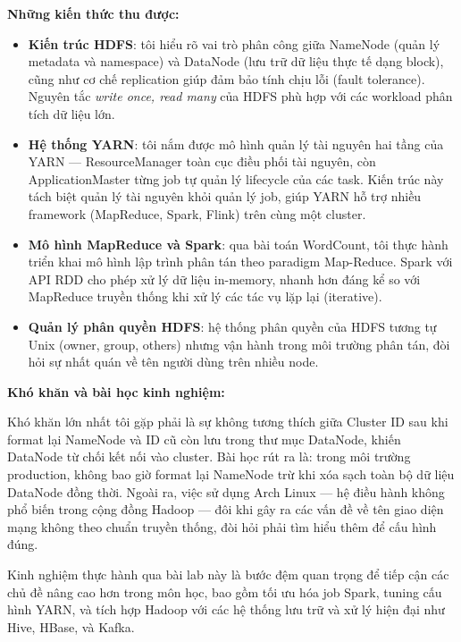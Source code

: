 \documentclass[12pt,a4paper]{article}
\begin{document}
\textbf{Những kiến thức thu được:}

\begin{itemize}
  \item \textbf{Kiến trúc HDFS}: tôi hiểu rõ vai trò phân công giữa NameNode (quản
        lý metadata và namespace) và DataNode (lưu trữ dữ liệu thực tế dạng block),
        cũng như cơ chế replication giúp đảm bảo tính chịu lỗi (fault tolerance).
        Nguyên tắc \textit{write once, read many} của HDFS phù hợp với các workload
        phân tích dữ liệu lớn.

  \item \textbf{Hệ thống YARN}: tôi nắm được mô hình quản lý tài nguyên hai tầng
        của YARN — ResourceManager toàn cục điều phối tài nguyên, còn ApplicationMaster
        từng job tự quản lý lifecycle của các task. Kiến trúc này tách biệt quản lý
        tài nguyên khỏi quản lý job, giúp YARN hỗ trợ nhiều framework (MapReduce,
        Spark, Flink) trên cùng một cluster.

  \item \textbf{Mô hình MapReduce và Spark}: qua bài toán WordCount, tôi thực hành
        triển khai mô hình lập trình phân tán theo paradigm Map-Reduce. Spark với
        API RDD cho phép xử lý dữ liệu in-memory, nhanh hơn đáng kể so với
        MapReduce truyền thống khi xử lý các tác vụ lặp lại (iterative).

  \item \textbf{Quản lý phân quyền HDFS}: hệ thống phân quyền của HDFS tương tự
        Unix (owner, group, others) nhưng vận hành trong môi trường phân tán, đòi
        hỏi sự nhất quán về tên người dùng trên nhiều node.
\end{itemize}

\textbf{Khó khăn và bài học kinh nghiệm:}

Khó khăn lớn nhất tôi gặp phải là sự không tương thích giữa Cluster ID sau khi
format lại NameNode và ID cũ còn lưu trong thư mục DataNode, khiến DataNode từ
chối kết nối vào cluster. Bài học rút ra là: trong môi trường production, không bao
giờ format lại NameNode trừ khi xóa sạch toàn bộ dữ liệu DataNode đồng thời. Ngoài
ra, việc sử dụng Arch Linux — hệ điều hành không phổ biến trong cộng đồng Hadoop —
đôi khi gây ra các vấn đề về tên giao diện mạng không theo chuẩn truyền thống, đòi
hỏi phải tìm hiểu thêm để cấu hình đúng.

Kinh nghiệm thực hành qua bài lab này là bước đệm quan trọng để tiếp cận các chủ
đề nâng cao hơn trong môn học, bao gồm tối ưu hóa job Spark, tuning cấu hình YARN,
và tích hợp Hadoop với các hệ thống lưu trữ và xử lý hiện đại như Hive, HBase, và
Kafka.
\end{document}

